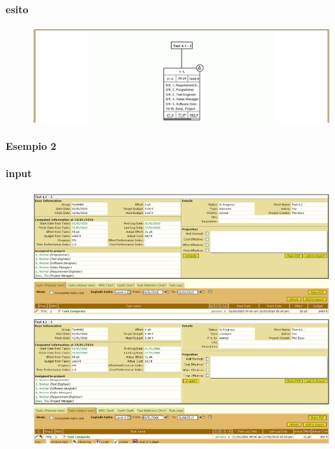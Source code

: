 \paragraph{esito}
\begin{figure}
\centering
\includegraphics[width=\textwidth]{tests/TEST_WBS/4.1/4.1_3/Esempio_1/output.png}
\end{figure}

\paragraph{Esempio 2}
\paragraph{input}
\begin{figure}
\centering
\includegraphics[width=\textwidth]{tests/TEST_WBS/4.1/4.1_3/Esempio_2/input.png}
\includegraphics[width=\textwidth]{tests/TEST_WBS/4.1/4.1_3/Esempio_2/input_actual.png}
\end{figure}
